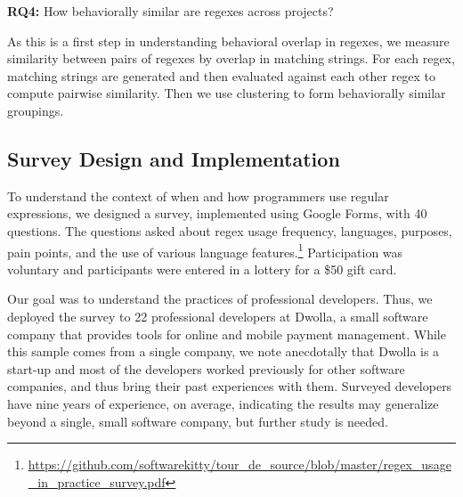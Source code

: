\noindent \textbf{RQ4:} How behaviorally similar are regexes across projects?

As this is a first step in understanding behavioral overlap in
regexes, we measure similarity between pairs of regexes by overlap in matching strings. For each regex, matching strings are generated and then  evaluated against each other regex to compute pairwise similarity. Then we use clustering to form behaviorally similar groupings.


%


\subsection{Survey Design and Implementation}
\label{study:survey}
To understand the context of when and how programmers use regular expressions,
we designed a survey, implemented using Google Forms, with 40 questions. The questions asked about regex usage frequency, languages, purposes, pain points, and the use of various language features.\footnote{\url{https://github.com/softwarekitty/tour_de_source/blob/master/regex_usage_in_practice_survey.pdf}}  Participation was voluntary and participants were entered in a lottery for a \$50 gift card.

Our goal was to understand the practices of professional developers. Thus, we deployed the survey to 22 professional developers at Dwolla, a small software company that provides tools for online and mobile payment management. While this sample comes from a single company, we note anecdotally that Dwolla is a start-up and most of the developers worked previously for other software companies, and thus bring their past experiences with them. Surveyed developers have nine years of experience, on average, indicating the results may generalize beyond a single, small software company, but further study is needed.




